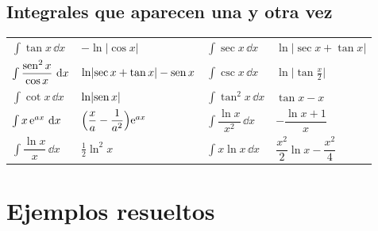 \documentclass[11pt,twoside]{article}
\newcommand\abs[1]{\lvert#1\rvert}
\begin{document}
\subsection{Integrales que aparecen una y otra vez}

\begin{center}
\renewcommand\arraystretch{1.45}
\small
\begin{tabular}{@{}l l @{\qquad} l l@{}}
\toprule
$\int\tan x\,\dd x$ & $-\ln\abs{\cos x}$ & $\int\sec x\,\dd x$ & $\ln\abs{\sec x+\tan x}$\\
$\int\dfrac{\operatorname{sen}^2x}{\cos x}\,\mathop{}\!\mathrm{d} x$ & $\ln\abs{\sec x+\tan x}-\sen x$ & $\int\csc x\,\dd x$ & $\ln\abs{\tan\tfrac x2}$\\
$\int\cot x\,\dd x$ & $\ln\abs{\sen x}$ & $\int\tan^2x\,\dd x$ & $\tan x-x$\\
$\int x\,\mathrm{e}^{ax}\,\mathop{}\!\mathrm{d} x$ & $\Big(\dfrac xa-\dfrac1{a^2}\Big)\mathrm{e}^{ax}$ & $\int\dfrac{\ln x}{x^2}\,\dd x$ & $-\dfrac{\ln x+1}{x}$\\
$\int\dfrac{\ln x}{x}\,\dd x$ & $\tfrac12\ln^2x$ & $\int x\ln x\,\dd x$ & $\dfrac{x^2}{2}\ln x-\dfrac{x^2}{4}$\\
\bottomrule
\end{tabular}
\end{center}

\section{Ejemplos resueltos}\label{sec:ejemplos}
\end{document}
